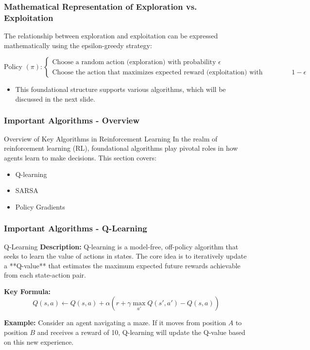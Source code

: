 \documentclass{beamer}
\begin{document}
\begin{frame}[fragile]
    \frametitle{Mathematical Representation of Exploration vs. Exploitation}
    The relationship between exploration and exploitation can be expressed mathematically using the epsilon-greedy strategy:
    
    \begin{equation}
        \text{Policy } (\pi): 
        \begin{cases}
            \text{Choose a random action (exploration) with probability } \epsilon \\
            \text{Choose the action that maximizes expected reward (exploitation) with probability } 1 - \epsilon
        \end{cases}
    \end{equation}
    
    \begin{itemize}
        \item This foundational structure supports various algorithms, which will be discussed in the next slide.
    \end{itemize}
\end{frame}

\begin{frame}[fragile]
    \frametitle{Important Algorithms - Overview}
    \begin{block}{Overview of Key Algorithms in Reinforcement Learning}
        In the realm of reinforcement learning (RL), foundational algorithms play pivotal roles in how agents learn to make decisions. 
        This section covers:
        \begin{itemize}
            \item Q-learning
            \item SARSA
            \item Policy Gradients
        \end{itemize}
    \end{block}
\end{frame}

\begin{frame}[fragile]
    \frametitle{Important Algorithms - Q-Learning}
    \begin{block}{Q-Learning}
        \textbf{Description:}  
        Q-learning is a model-free, off-policy algorithm that seeks to learn the value of actions in states. The core idea is to iteratively update a **Q-value** that estimates the maximum expected future rewards achievable from each state-action pair.

        \textbf{Key Formula:}
        \begin{equation}
        Q(s, a) \leftarrow Q(s, a) + \alpha \left( r + \gamma \max_{a'} Q(s', a') - Q(s, a) \right)
        \end{equation}
        
        \textbf{Example:}  
        Consider an agent navigating a maze. If it moves from position \( A \) to position \( B \) and receives a reward of 10, Q-learning will update the Q-value based on this new experience.
    \end{block}
\end{frame}
\end{document}
